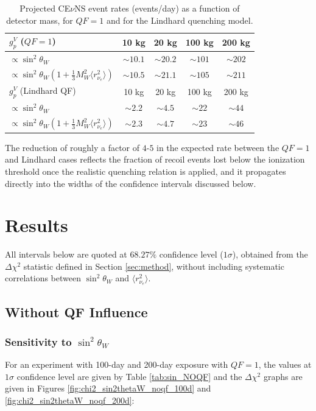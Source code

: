 \begin{table}[H]
\centering
\caption{Projected CE$\nu$NS event rates (events/day) as a function of detector mass, for $QF=1$ and for the Lindhard quenching model.}
\label{tab:event_rates}
\begin{tabular}{lcccc}
\hline
$g_p^V$ ($QF=1$) & 10 kg & 20 kg & 100 kg & 200 kg \\
\hline
$\propto \sin^2\theta_W$ & $\sim 10.1$ & $\sim 20.2$ & $\sim 101$ & $\sim 202$ \\
$\propto \sin^2\theta_W\left(1+\tfrac{1}{3}M_W^2\langle r_{\nu_e}^2\rangle\right)$ & $\sim 10.5$ & $\sim 21.1$ & $\sim 105$ & $\sim 211$ \\
\hline
\hline
$g_p^V$ (Lindhard QF) & 10 kg & 20 kg & 100 kg & 200 kg \\
\hline
$\propto \sin^2\theta_W$ & $\sim 2.2$ & $\sim 4.5$ & $\sim 22$ & $\sim 44$ \\
$\propto \sin^2\theta_W\left(1+\tfrac{1}{3}M_W^2\langle r_{\nu_e}^2\rangle\right)$ & $\sim 2.3$ & $\sim 4.7$ & $\sim 23$ & $\sim 46$ \\
\hline
\end{tabular}
\end{table}

The reduction of roughly a factor of $4$-$5$ in the expected rate between the $QF=1$ and Lindhard cases reflects the fraction of recoil events lost below the ionization threshold once the realistic quenching relation is applied, and it propagates directly into the widths of the confidence intervals discussed below.

\section{Results}
All intervals below are quoted at $68.27\%$ confidence level ($1\sigma$), obtained from the $\Delta\chi^2$ statistic defined in Section \ref{sec:method}, without including systematic correlations between $\sin^2\theta_W$ and $\langle r_{\nu_e}^2\rangle$.

\subsection{Without QF Influence}

\subsubsection{Sensitivity to \texorpdfstring{$\sin^2\theta_W$}{sin2thetaW}}
For an experiment with 100-day and 200-day exposure with $QF=1$, the values at $1\sigma$ confidence level are given by Table \ref{tab:sin_NOQF} and the $\Delta \chi^2$ graphs are given in Figures \ref{fig:chi2_sin2thetaW_noqf_100d} and \ref{fig:chi2_sin2thetaW_noqf_200d}:

